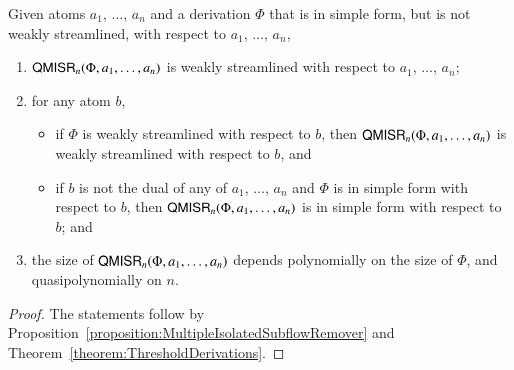 \begin{proposition}\label{proposition:QuasipolynomialMultipleIsolatedSubflowRemover}
Given atoms $a_1$, $\dots$, $a_n$ and a derivation $\Phi$ that is in simple form, but is not weakly streamlined, with respect to $a_1$, $\dots$, $a_n$,
\begin{enumerate}
\item $\mathsf{QMISR}_n(\Phi,a_1,\dots,a_n)$ is weakly streamlined with respect to $a_1$, $\dots$, $a_n$;
\item for any atom $b$,
\begin{itemize}
\item if $\Phi$ is weakly streamlined with respect to $b$, then $\mathsf{QMISR}_n(\Phi,a_1,\dots,a_n)$ is weakly streamlined with respect to $b$, and
\item if $b$ is not the dual of any of $a_1$, $\dots$, $a_n$ and $\Phi$ is in simple form with respect to $b$, then $\mathsf{QMISR}_n(\Phi,a_1,\dots,a_n)$ is in simple form with respect to $b$; and
\end{itemize}
\item the size of\/ $\mathsf{QMISR}_n(\Phi,a_1,\dots,a_n)$ depends polynomially on the size of\/ $\Phi$, and quasipolynomially on $n$.
\end{enumerate}
\end{proposition}

\begin{proof}
The statements follow by Proposition~\vref{proposition:MultipleIsolatedSubflowRemover} and Theorem~\vref{theorem:ThresholdDerivations}.
\end{proof}
